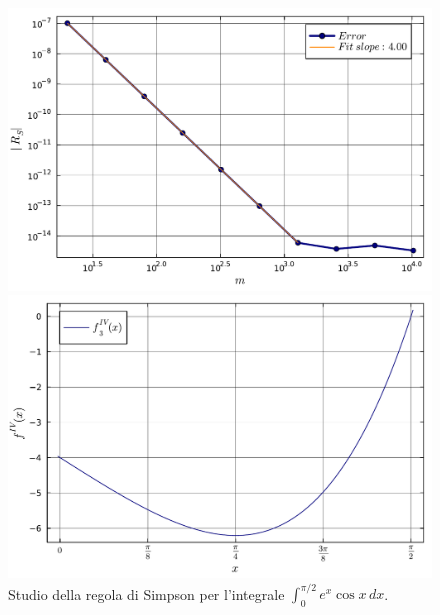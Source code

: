 \documentclass[letterpaper, 12pt]{article}
\numberwithin{equation}{section}    %
\begin{document}
\begin{figure}[!ht]
    \centering
    \begin{minipage}[b]{0.42\textwidth}
        \includegraphics[width=\textwidth]{5143.pdf}
    \end{minipage}
    \hspace{0.5cm}
    \begin{minipage}[b]{0.42\textwidth}
        \includegraphics[width=\textwidth]{5143_2.pdf}
    \end{minipage}
    \caption{Studio della regola di Simpson per l'integrale $\int_0^{\pi/2}e^x \cos x\, dx$.}
    \label{fig:es5_1_4_3}
\end{figure}
\end{document}
